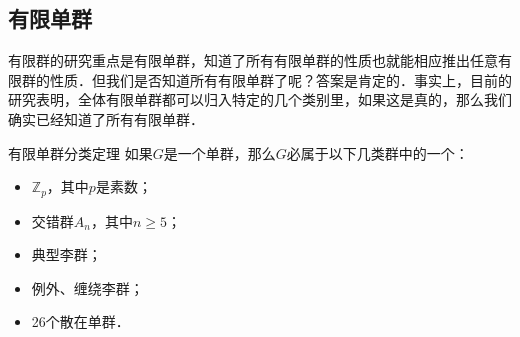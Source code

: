\subsection{有限单群}

有限群的研究重点是有限单群，知道了所有有限单群的性质也就能相应推出任意有限群的性质．但我们是否知道所有有限单群了呢？答案是肯定的．事实上，目前的研究表明，全体有限单群都可以归入特定的几个类别里，如果这是真的，那么我们确实已经知道了所有有限单群．

\begin{definition}{有限单群分类定理}
如果$G$是一个单群，那么$G$必属于以下几类群中的一个：
\begin{itemize}
\item $\mathbb{Z}_p$，其中$p$是素数；
\item 交错群$A_n$，其中$n\geq 5$；
\item 典型李群；
\item 例外、缠绕李群；
\item 26个散在单群．
\end{itemize}


\end{definition}










